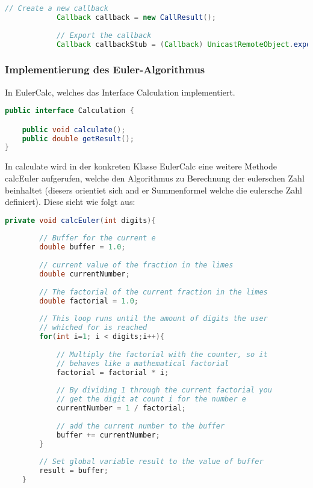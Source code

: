 \begin{lstlisting}[caption=Implementierung des Callback am Client, language=Java]
			// Create a new callback
			Callback callback = new CallResult();
			
			// Export the callback
			Callback callbackStub = (Callback) UnicastRemoteObject.exportObject(callback,0);
\end{lstlisting}

\subsubsection{Implementierung des Euler-Algorithmus}

In EulerCalc, welches das Interface Calculation implementiert.

\begin{lstlisting}[caption=Calculation Interface, language=Java]
	public interface Calculation {

	public void calculate();
	public double getResult();
}
\end{lstlisting}

In calculate wird in der konkreten Klasse EulerCalc eine weitere Methode calcEuler aufgerufen, welche den Algorithmus zu Berechnung der eulerschen Zahl beinhaltet (diesers orientiet sich and er Summenformel welche die eulersche Zahl definiert). Diese sieht wie folgt aus:

\begin{lstlisting}[caption=Algorithms der eulerschen Zahl, language=Java]
	private void calcEuler(int digits){
		
		// Buffer for the current e
		double buffer = 1.0; 
		
		// current value of the fraction in the limes
		double currentNumber;
		
		// The factorial of the current fraction in the limes
		double factorial = 1.0;
		
		// This loop runs until the amount of digits the user
		// whiched for is reached
		for(int i=1; i < digits;i++){
			
			// Multiply the factorial with the counter, so it
			// behaves like a mathematical factorial
			factorial = factorial * i; 
			
			// By dividing 1 through the current factorial you
			// get the digit at count i for the number e
			currentNumber = 1 / factorial;
			
			// add the current number to the buffer
			buffer += currentNumber;
		}
		
		// Set global variable result to the value of buffer
		result = buffer;
	}
\end{lstlisting}

